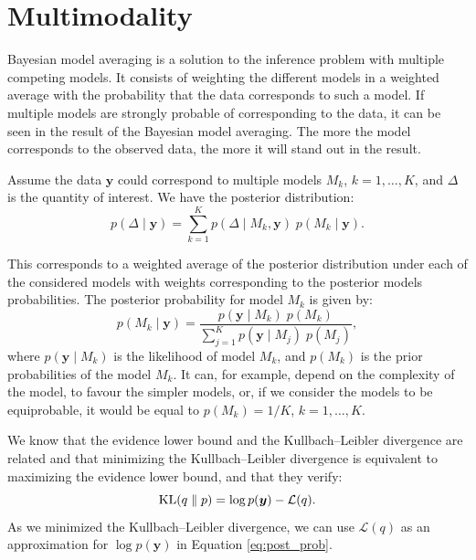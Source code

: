 \documentclass{article}
\numberwithin{equation}{section}
\DeclareMathOperator*{\KL}{{\rm KL}}
\begin{document}
\newpage
\section{Multimodality}

Bayesian model averaging is a solution to the inference problem with multiple competing models. It consists of weighting the different models in a weighted average with the probability that the data corresponds to such a model. If multiple models are strongly probable of corresponding to the data, it can be seen in the result of the Bayesian model averaging. The more the model corresponds to the observed data, the more it will stand out in the result.

Assume the data $\boldsymbol{y}$ could correspond to multiple models $M_k$, $k= 1,\ldots,K$, and $\Delta$ is the quantity of interest. We have the posterior distribution:
\begin{equation}
p(\Delta \mid \boldsymbol{y}) = \sum_{k=1}^K p(\Delta \mid M_k,\boldsymbol{y}) \; p(M_k \mid \boldsymbol{y}).
\label{eq:post_dist}
\end{equation}

This corresponds to a weighted average of the posterior distribution under each of the considered models with weights corresponding to the posterior models probabilities. The posterior probability for model $M_k$ is given by:
\begin{equation}
p(M_k \mid \boldsymbol{y}) = \frac{p(\boldsymbol{y} \mid M_k)\; p(M_k)}{\sum_{j=1}^K p(\boldsymbol{y} \mid M_j)\; p(M_j)},
\label{eq:post_prob}
\end{equation}
where $p(\boldsymbol{y} \mid M_k)$ is the likelihood of model $M_k$, and $p(M_k)$ is the prior probabilities of the model $M_k$. It can, for example, depend on the complexity of the model, to favour the simpler models, or, if we consider the models to be equiprobable, it would be equal to $p(M_k) = 1/K$, $k = 1,\ldots,K$.  

We know that the evidence lower bound and the Kullbach--Leibler divergence are related and that minimizing the Kullbach--Leibler divergence is equivalent to maximizing the evidence lower bound, and that they verify: 
\begin{equation*}
\KL(q\parallel p) = \log p (\boldsymbol{y}) - \mathcal{L}(q).
\end{equation*}
As we minimized the Kullbach--Leibler divergence, we can use $\mathcal{L}(q)$ as an approximation for $\log p(\boldsymbol{y})$ in Equation \ref{eq:post_prob}.
\end{document}
